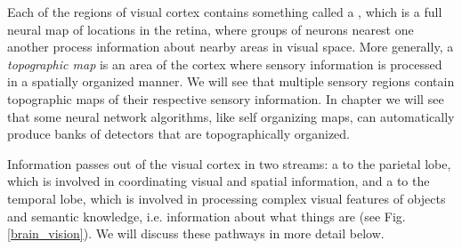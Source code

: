Each of the regions of visual cortex contains something called a , which is a full neural map of locations in the retina, where groups of neurons nearest one another process information about nearby areas in visual space. More generally, a \emph{topographic map} is an area of the cortex where sensory information is processed in a spatially organized manner. We will see that multiple sensory regions contain topographic maps of their respective sensory information. In chapter  we will see that some neural network algorithms, like self organizing maps, can automatically produce banks of detectors that are topographically organized.

Information passes out of the visual cortex in two streams: a  to the parietal lobe, which is involved in coordinating visual and spatial information, and a  to the temporal lobe, which is involved in processing complex visual features of objects and semantic knowledge, i.e. information about what things are  (see Fig. \ref{brain_vision}). We will discuss these pathways in more detail below.

